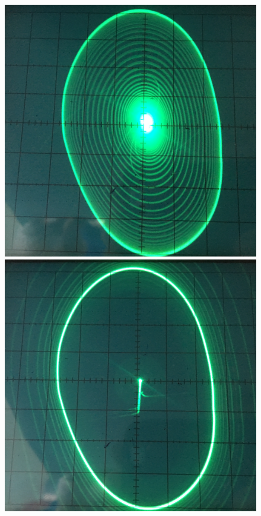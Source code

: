 \begin{figure}[h!]
	\centering
	\begin{minipage}{0.32\linewidth}
	\includegraphics[width=\linewidth]{photo/task3b(rightm).jpg}
	\end{minipage}
	\begin{minipage}{0.32\linewidth}
	\includegraphics[width=\linewidth]{photo/task3b(rightL).jpg}

\end{minipage}
\end{figure}
